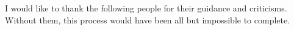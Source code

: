 
\begin{acknowledgments}
I would like to thank the following people for their guidance and criticisms.  Without them, this process would have been all but impossible to complete.
\end{acknowledgments}